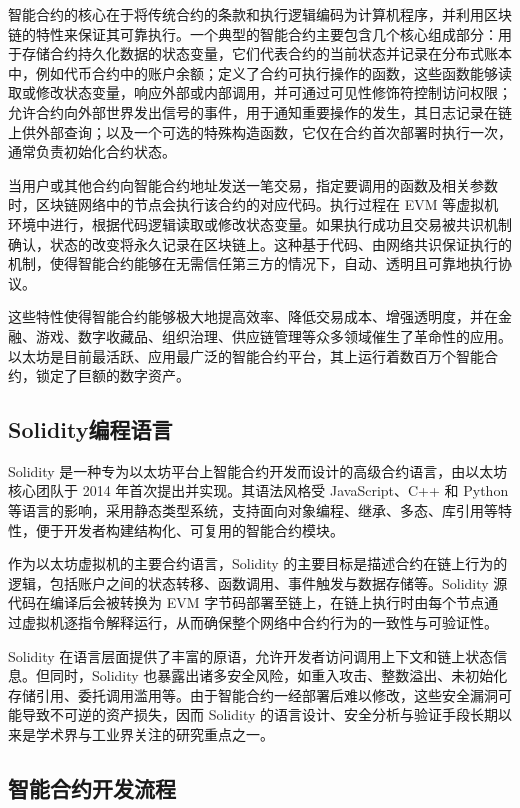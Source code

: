\documentclass[print, master, vlined, timesmath]{DissertUESTC}
\begin{document}
智能合约的核心在于将传统合约的条款和执行逻辑编码为计算机程序，并利用区块链的特性来保证其可靠执行。一个典型的智能合约主要包含几个核心组成部分：用于存储合约持久化数据的状态变量，它们代表合约的当前状态并记录在分布式账本中，例如代币合约中的账户余额；定义了合约可执行操作的函数，这些函数能够读取或修改状态变量，响应外部或内部调用，并可通过可见性修饰符控制访问权限；允许合约向外部世界发出信号的事件，用于通知重要操作的发生，其日志记录在链上供外部查询；以及一个可选的特殊构造函数，它仅在合约首次部署时执行一次，通常负责初始化合约状态。

当用户或其他合约向智能合约地址发送一笔交易，指定要调用的函数及相关参数时，区块链网络中的节点会执行该合约的对应代码。执行过程在 EVM 等虚拟机环境中进行，根据代码逻辑读取或修改状态变量。如果执行成功且交易被共识机制确认，状态的改变将永久记录在区块链上。这种基于代码、由网络共识保证执行的机制，使得智能合约能够在无需信任第三方的情况下，自动、透明且可靠地执行协议。

这些特性使得智能合约能够极大地提高效率、降低交易成本、增强透明度，并在金融、游戏、数字收藏品、组织治理、供应链管理等众多领域催生了革命性的应用。以太坊是目前最活跃、应用最广泛的智能合约平台，其上运行着数百万个智能合约，锁定了巨额的数字资产。

\subsection{Solidity编程语言}

Solidity 是一种专为以太坊平台上智能合约开发而设计的高级合约语言，由以太坊核心团队于 2014 年首次提出并实现。其语法风格受 JavaScript、C++ 和 Python 等语言的影响，采用静态类型系统，支持面向对象编程、继承、多态、库引用等特性，便于开发者构建结构化、可复用的智能合约模块。

作为以太坊虚拟机的主要合约语言，Solidity 的主要目标是描述合约在链上行为的逻辑，包括账户之间的状态转移、函数调用、事件触发与数据存储等。Solidity 源代码在编译后会被转换为 EVM 字节码部署至链上，在链上执行时由每个节点通过虚拟机逐指令解释运行，从而确保整个网络中合约行为的一致性与可验证性。

Solidity 在语言层面提供了丰富的原语，允许开发者访问调用上下文和链上状态信息。但同时，Solidity 也暴露出诸多安全风险，如重入攻击、整数溢出、未初始化存储引用、委托调用滥用等。由于智能合约一经部署后难以修改，这些安全漏洞可能导致不可逆的资产损失，因而 Solidity 的语言设计、安全分析与验证手段长期以来是学术界与工业界关注的研究重点之一。

\subsection{智能合约开发流程}
\end{document}
